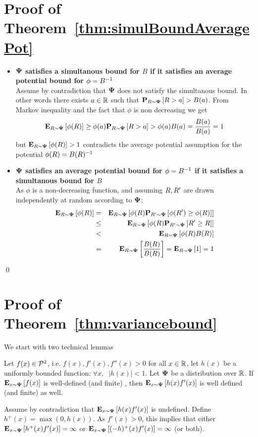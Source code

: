 \documentclass{article}[12pt]
\begin{document}
\section{Proof of Theorem~\ref{thm:simulBoundAveragePot}}
\proof
  \begin{itemize}
  \item
  {\bf ${\bf \Psi}$ satisfies a simultanous bound for $B$ if it satisfies an
  average potential bound for $\phi = B^{-1}$}\\
Assume by contradiction that ${\bf \Psi}$ does not satisfy the simultanous bound. In
other words there exists $a \in \mathbb{R}$ such that
${\bf P}_{R \sim {\bf \Psi}}\left[ R > a \right] > B(a)$. From Markov inequality and the fact
that $\phi$ is non decreasing we get
\[
  {\bf E}_{R \sim {\bf \Psi}}\left[ \phi(R) \right] \geq \phi(a) {\bf P}_{R \sim {\bf \Psi}}\left[ R > a \right] >
  \phi(a) B(a) = \frac{B(a)}{B(a)}=1
\]
but $ {\bf E}_{R \sim {\bf \Psi}}\left[ \phi(R) \right] >1$ contradicts the average potential
assumption for the potential $\phi(R) = B(R)^{-1}$
\item
{\bf ${\bf \Psi}$ satisfies an
  average potential bound for $\phi = B^{-1}$ if it satisfies a simultanous bound for $B$}\\
As $\phi$ is a non-decreasing function, and assuming $R,R'$ are drawn
independently at random according to ${\bf \Psi}$:
\begin{eqnarray}
  {\bf E}_{R \sim {\bf \Psi}}\left[ \phi(R) \right] & = & {\bf E}_{R \sim {\bf \Psi}}\left[ \phi(R)
                                  {\bf P}_{R' \sim {\bf \Psi}}\left[ \phi(R') \geq \phi(R) \right] \right] \\
                            & \leq & {\bf E}_{R \sim {\bf \Psi}}\left[ \phi(R)
                                     {\bf P}_{R' \sim {\bf \Psi}}\left[ R' \geq R \right] \right] \\
                            & < & {\bf E}_{R \sim {\bf \Psi}}\left[ \phi(R) B(R) \right] \\
                            & = & {\bf E}_{R \sim {\bf \Psi}}\left[ \frac{B(R)}{B(R)} \right]
                                  = {\bf E}_{R \sim {\bf \Psi}}\left[ 1 \right] = 1
\end{eqnarray}
\end{itemize}
\qed

\section{Proof of Theorem~\ref{thm:variancebound}}
\label{appendix:ProofOfVarianceBound}
We start with two technical lemmas
\begin{lemma} \label{lemma:infiniteexpectations}
Let $f(x) \in {\cal P}^{2}$, i.e. $f(x), f'(x),f''(x) >0$ for all $x \in
\mathbb{R}$, let $h(x)$ be a uniformly bounded function: $\forall x,\;\; |h(x)|<1$.
Let ${\bf \Psi}$ be a distribution over $\mathbb{R}$.
If ${\bf E}_{x \sim {\bf \Psi}}\left[ f(x) \right]$ is well-defined (and finite) , then 
${\bf E}_{x \sim {\bf \Psi}}\left[ h(x) f'(x) \right]$ is well defined (and finite) as well.
\end{lemma}
\proof
Assume by contradiction that ${\bf E}_{x \sim {\bf \Psi}}\left[ h(x) f'(x) \right]$ is
undefined. Define $h^+(x) = \max(0,h(x))$.
As $f'(x)>0$, this implies that either ${\bf E}_{x \sim {\bf \Psi}}\left[ h^+(x)
  f'(x) \right]=\infty$ or ${\bf E}_{x \sim {\bf \Psi}}\left[ (-h)^+(x) f'(x) \right]=\infty$ (or both). 
\end{document}
